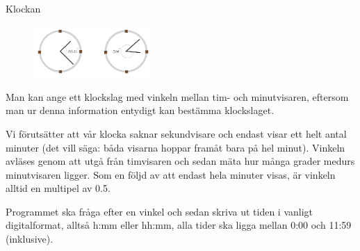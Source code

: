 \documentclass[10pt]{beamer}
\begin{document}
\begin{frame}{Klockan}

\begin{figure}[!ht]
\centering
\includegraphics[width=0.4\textwidth]{klocka}
\label{fig:klocka}
\end{figure}

Man kan ange ett klockslag med vinkeln mellan tim- och minutvisaren, eftersom man ur denna information entydigt kan bestämma klockslaget.

Vi förutsätter att vår klocka saknar sekundvisare och endast visar ett helt antal minuter (det vill säga: båda visarna hoppar framåt bara på hel minut). Vinkeln avläses genom att utgå från timvisaren och sedan mäta hur många grader medurs minutvisaren ligger. Som en följd av att endast hela minuter visas, är vinkeln alltid en multipel av 0.5.

Programmet ska fråga efter en vinkel och sedan skriva ut tiden i vanligt digitalformat, alltså h:mm eller hh:mm, alla tider ska ligga mellan 0:00 och 11:59 (inklusive).

\end{frame}
\end{document}
